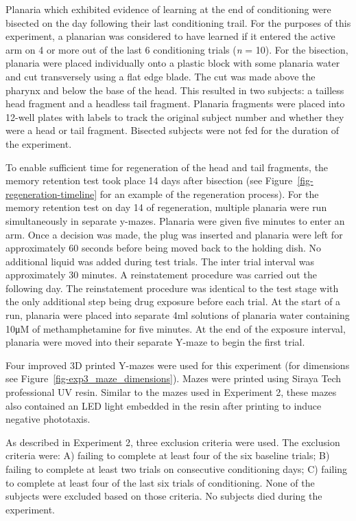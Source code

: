 \documentclass[
  jou,
  floatsintext,
  longtable,
  nolmodern,
  notxfonts,
  notimes,
  donotrepeattitle,
  colorlinks=true,linkcolor=blue,citecolor=blue,urlcolor=blue]{apa7}
\begin{document}
Planaria which exhibited evidence of learning at the end of conditioning
were bisected on the day following their last conditioning trail. For
the purposes of this experiment, a planarian was considered to have
learned if it entered the active arm on 4 or more out of the last 6
conditioning trials (\emph{n} = 10). For the bisection, planaria were
placed individually onto a plastic block with some planaria water and
cut transversely using a flat edge blade. The cut was made above the
pharynx and below the base of the head. This resulted in two subjects: a
tailless head fragment and a headless tail fragment. Planaria fragments
were placed into 12-well plates with labels to track the original
subject number and whether they were a head or tail fragment. Bisected
subjects were not fed for the duration of the experiment.

To enable sufficient time for regeneration of the head and tail
fragments, the memory retention test took place 14 days after bisection
(see Figure~\ref{fig-regeneration-timeline} for an example of the
regeneration process). For the memory retention test on day 14 of
regeneration, multiple planaria were run simultaneously in separate
y-mazes. Planaria were given five minutes to enter an arm. Once a
decision was made, the plug was inserted and planaria were left for
approximately 60 seconds before being moved back to the holding dish. No
additional liquid was added during test trials. The inter trial interval
was approximately 30 minutes. A reinstatement procedure was carried out
the following day. The reinstatement procedure was identical to the test
stage with the only additional step being drug exposure before each
trial. At the start of a run, planaria were placed into separate 4ml
solutions of planaria water containing 10μM of methamphetamine for five
minutes. At the end of the exposure interval, planaria were moved into
their separate Y-maze to begin the first trial.

Four improved 3D printed Y-mazes were used for this experiment (for
dimensions see Figure~\ref{fig-exp3_maze_dimensions}). Mazes were
printed using Siraya Tech professional UV resin. Similar to the mazes
used in Experiment 2, these mazes also contained an LED light embedded
in the resin after printing to induce negative phototaxis.

As described in Experiment 2, three exclusion criteria were used. The
exclusion criteria were: A) failing to complete at least four of the six
baseline trials; B) failing to complete at least two trials on
consecutive conditioning days; C) failing to complete at least four of
the last six trials of conditioning. None of the subjects were excluded
based on those criteria. No subjects died during the experiment.
\end{document}
